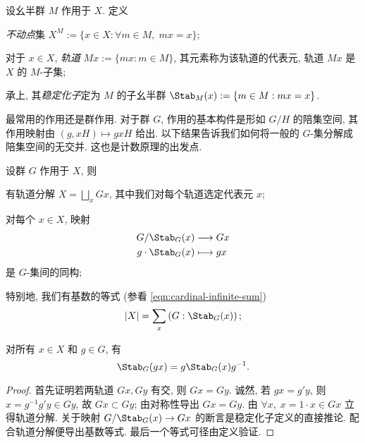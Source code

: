 \begin{definition}
	设幺半群 $M$ 作用于 $X$. 定义
	\begin{compactitem}
		\item \emph{不动点}集 $X^M := \{x \in X: \forall m \in M, \; mx=x \}$;
		\item 对于 $x \in X$, \emph{轨道} $Mx := \{mx : m \in M \}$, 其元素称为该轨道的代表元, 轨道 $Mx$ 是 $X$ 的 $M$-子集;
		\item 承上, 其\emph{稳定化子}定为 $M$ 的子幺半群 $\Stab_M(x) := \{m \in M : mx=x\}$.
	\end{compactitem}
\end{definition}

最常用的作用还是群作用. 对于群 $G$, 作用的基本构件是形如 $G/H$ 的陪集空间, 其作用映射由 $(g, xH) \mapsto gxH$ 给出. 以下结果告诉我们如何将一般的 $G$-集分解成陪集空间的无交并. 这也是计数原理的出发点.

\begin{lemma}\label{prop:orbit-decomp}
	设群 $G$ 作用于 $X$, 则
	\begin{compactenum}[(i)]
		\item 有轨道分解 $X = \bigsqcup_x Gx$, 其中我们对每个轨道选定代表元 $x$;
		\item 对每个 $x \in X$, 映射
			\begin{align*}
				G/\Stab_G(x) & \longrightarrow Gx \\
				g \cdot \Stab_G(x) & \longmapsto gx
			\end{align*}
			是 $G$-集间的同构;
		\item 特别地, 我们有基数的等式 (参看 \eqref{eqn:cardinal-infinite-sum})
			\[ |X| = \sum_x \left( G: \Stab_G(x) \right); \]
		\item 对所有 $x \in X$ 和 $g \in G$, 有
			\[ \Stab_G(gx) = g \Stab_G(x) g^{-1}. \]
	\end{compactenum}
\end{lemma}
\begin{proof}
	首先证明若两轨道 $Gx, Gy$ 有交, 则 $Gx=Gy$. 诚然, 若 $gx=g'y$, 则 $x = g^{-1}g' y \in Gy$, 故 $Gx \subset Gy$; 由对称性导出 $Gx=Gy$. 由 $\forall x, \; x = 1\cdot x \in Gx$ 立得轨道分解. 关于映射 $G/\Stab_G(x) \to Gx$ 的断言是稳定化子定义的直接推论. 配合轨道分解便导出基数等式. 最后一个等式可径由定义验证.
\end{proof}


